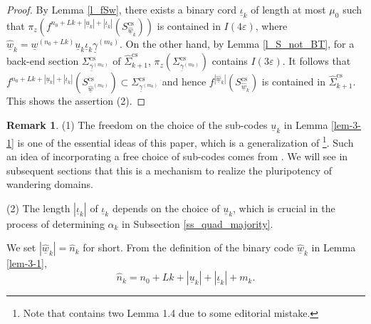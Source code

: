 \documentclass{amsart}
\theoremstyle{definition}
\newtheorem{rmk}[thm]{Remark}
\numberwithin{equation}{section}
\numberwithin{figure}{section}
\begin{document}
\begin{proof}
By Lemma \ref{l_fSw}, there exists a binary cord $\underline{\iota}_k$ of length at most $\mu_0$ such that 
$\pi_z(f^{n_0+Lk+|\underline{u}_k|+|\underline{\iota}_k|}(S_{\widehat{\underline w}_k}^{\mathrm{cs}}))$ is contained in $I(4\varepsilon)$, 
where 
$\widehat{\underline{w}}_k=\underline{w}^{(n_0+Lk)}\underline{u}_k\underline{\iota}_k\underline{\gamma}^{(m_k)}$.
On the other hand, by Lemma \ref{l_S_not_BT}, for a back-end section $\Sigma_{\underline{\gamma}^{(m_k)}}^{\mathrm{cs}}$ of $\widehat{\Sigma}_{k+1}^{\mathrm{cs}}$, $\pi_z(\Sigma_{\underline{\gamma}^{(m_k)}}^{\mathrm{cs}})$ contains $I(3\varepsilon)$.
It follows that $f^{n_0+Lk+|\underline{u}_k|+|\underline{\iota}_k|}(S_{\widehat{\underline{w}}^{(m_k)}}^{\mathrm{cs}})\subset \Sigma_{\underline{\gamma}^{(m_k)}}^{\mathrm{cs}}$ and hence 
$f^{|\widehat{\underline{w}}_k|}(S_{\widehat{\underline{w}}_k}^{\mathrm{cs}})$ is contained in $\widehat{\Sigma}_{k+1}^{\mathrm{cs}}$.
This shows the assertion (2).
\end{proof}


\begin{rmk}\label{r_Lemma8.1} 
(1) 
The freedom on the choice of the sub-codes $\underline{u}_k$ in Lemma \ref{lem-3-1} is one of the essential ideas of this paper, which is 
a generalization of \cite[page 4015, Lemma 1.4]{KNS23}\footnote{Note that \cite{KNS23} contains two Lemma 1.4 
due to some editorial mistake.}. 
Such an idea of incorporating a free choice of sub-codes comes from \cite{CV01}.
We will see in subsequent sections that 
this is a mechanism to realize the pluripotency of wandering domains.

\noindent(2) 
The length $|\underline{\iota}_k|$ of $\underline{\iota}_k$ depends on the choice of $\underline{u}_k$, which is 
crucial in the process of determining $\alpha_k$ in Subsection \ref{ss_quad_majority}.
\end{rmk}




We set $|\widehat{\underline{w}}_k|=\widehat n_k$ for short.
From the definition of the binary code $\widehat{\underline{w}}_k$ in Lemma \ref{lem-3-1}, 
\begin{equation}\label{eqn_hatn0}
\widehat n_k=n_0+Lk+|\underline{u}_k|+|\underline{\iota}_k|+m_k.
\end{equation}
\end{document}
